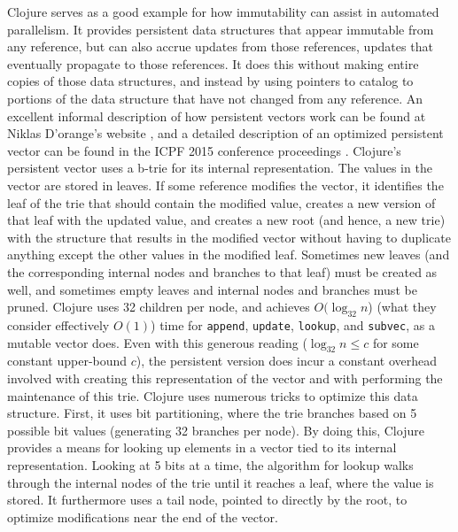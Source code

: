 Clojure serves as a good example for how immutability can assist in automated
parallelism. It provides persistent data structures that appear immutable from
any reference, but can also accrue updates from those references, updates that
eventually propagate to those references. It does this without making entire
copies of those data structures, and instead by using pointers to catalog to
portions of the data structure that have not changed from any reference. An
excellent informal description of how persistent vectors work can be found at
Niklas D'orange's website \cite{persvec1}, and a detailed description of an
optimized persistent vector can be found in the ICPF 2015 conference proceedings
\cite{rrb_vec}.  Clojure’s persistent vector uses a b-trie for its internal
representation. The values in the vector are stored in leaves. If some reference
modifies the vector, it identifies the leaf of the trie that should contain the
modified value, creates a new version of that leaf with the updated value, and
creates a new root (and hence, a new trie) with the structure that results in
the modified vector without having to duplicate anything except the other values 
in the modified leaf. Sometimes new leaves (and the corresponding internal nodes
and branches to that leaf) must be created as well, and sometimes empty leaves
and internal nodes and branches must be pruned.  Clojure uses 32 children per
node, and achieves $O(\log_{32} n$) (what they consider effectively $O(1)$)
time for \texttt{append}, \texttt{update}, \texttt{lookup}, and \texttt{subvec},
as a mutable vector does. Even with this generous reading ($\log_{32} n \leq c$
for some constant upper-bound $c$), the persistent version does incur a constant
overhead involved with creating this representation of the vector and with
performing the maintenance of this trie. Clojure uses numerous tricks to
optimize this data structure. First, it uses bit partitioning, where the trie
branches based on 5 possible bit values (generating 32 branches per node). By
doing this, Clojure provides a means for looking up elements in a vector tied to
its internal representation. Looking at 5 bits at a time, the algorithm for
lookup walks through the internal nodes of the trie until it reaches a leaf,
where the value is stored. It furthermore uses a tail node, pointed to directly
by the root, to optimize modifications near the end of the vector.

